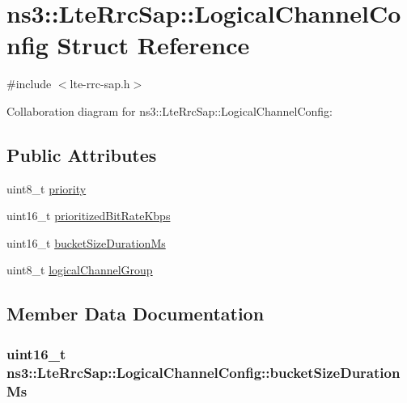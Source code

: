 \hypertarget{structns3_1_1LteRrcSap_1_1LogicalChannelConfig}{}\section{ns3\+:\+:Lte\+Rrc\+Sap\+:\+:Logical\+Channel\+Config Struct Reference}
\label{structns3_1_1LteRrcSap_1_1LogicalChannelConfig}


{\ttfamily \#include $<$lte-\/rrc-\/sap.\+h$>$}



Collaboration diagram for ns3\+:\+:Lte\+Rrc\+Sap\+:\+:Logical\+Channel\+Config\+:
\subsection*{Public Attributes}
\begin{DoxyCompactItemize}
\item 
uint8\+\_\+t \hyperlink{structns3_1_1LteRrcSap_1_1LogicalChannelConfig_a8db687be39b6631fc05232b6264422f3}{priority}
\item 
uint16\+\_\+t \hyperlink{structns3_1_1LteRrcSap_1_1LogicalChannelConfig_ac1a5aeec29094b3f40dae4dc949b4dab}{prioritized\+Bit\+Rate\+Kbps}
\item 
uint16\+\_\+t \hyperlink{structns3_1_1LteRrcSap_1_1LogicalChannelConfig_aaf72b8b1bdaf2286d2481994ef124cb6}{bucket\+Size\+Duration\+Ms}
\item 
uint8\+\_\+t \hyperlink{structns3_1_1LteRrcSap_1_1LogicalChannelConfig_ae60ea4e76caeaf8d45098f06498463c4}{logical\+Channel\+Group}
\end{DoxyCompactItemize}


\subsection{Member Data Documentation}
\subsubsection[{\texorpdfstring{bucket\+Size\+Duration\+Ms}{bucketSizeDurationMs}}]{\setlength{\rightskip}{0pt plus 5cm}uint16\+\_\+t ns3\+::\+Lte\+Rrc\+Sap\+::\+Logical\+Channel\+Config\+::bucket\+Size\+Duration\+Ms}\hypertarget{structns3_1_1LteRrcSap_1_1LogicalChannelConfig_aaf72b8b1bdaf2286d2481994ef124cb6}{}\label{structns3_1_1LteRrcSap_1_1LogicalChannelConfig_aaf72b8b1bdaf2286d2481994ef124cb6}
